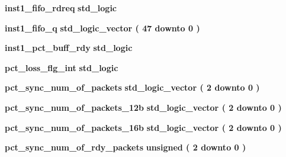 \begin{DoxyCompactItemize}
\item 
{\bf inst1\+\_\+fifo\+\_\+rdreq} {\bfseries \textcolor{comment}{std\+\_\+logic}\textcolor{vhdlchar}{ }} 
\item 
{\bf inst1\+\_\+fifo\+\_\+q} {\bfseries \textcolor{comment}{std\+\_\+logic\+\_\+vector}\textcolor{vhdlchar}{ }\textcolor{vhdlchar}{(}\textcolor{vhdlchar}{ }\textcolor{vhdlchar}{ } \textcolor{vhdldigit}{47} \textcolor{vhdlchar}{ }\textcolor{keywordflow}{downto}\textcolor{vhdlchar}{ }\textcolor{vhdlchar}{ } \textcolor{vhdldigit}{0} \textcolor{vhdlchar}{ }\textcolor{vhdlchar}{)}\textcolor{vhdlchar}{ }} 
\item 
{\bf inst1\+\_\+pct\+\_\+buff\+\_\+rdy} {\bfseries \textcolor{comment}{std\+\_\+logic}\textcolor{vhdlchar}{ }} 
\item 
{\bf pct\+\_\+loss\+\_\+flg\+\_\+int} {\bfseries \textcolor{comment}{std\+\_\+logic}\textcolor{vhdlchar}{ }} 
\item 
{\bf pct\+\_\+sync\+\_\+num\+\_\+of\+\_\+packets} {\bfseries \textcolor{comment}{std\+\_\+logic\+\_\+vector}\textcolor{vhdlchar}{ }\textcolor{vhdlchar}{(}\textcolor{vhdlchar}{ }\textcolor{vhdlchar}{ } \textcolor{vhdldigit}{2} \textcolor{vhdlchar}{ }\textcolor{keywordflow}{downto}\textcolor{vhdlchar}{ }\textcolor{vhdlchar}{ } \textcolor{vhdldigit}{0} \textcolor{vhdlchar}{ }\textcolor{vhdlchar}{)}\textcolor{vhdlchar}{ }} 
\item 
{\bf pct\+\_\+sync\+\_\+num\+\_\+of\+\_\+packets\+\_\+12b} {\bfseries \textcolor{comment}{std\+\_\+logic\+\_\+vector}\textcolor{vhdlchar}{ }\textcolor{vhdlchar}{(}\textcolor{vhdlchar}{ }\textcolor{vhdlchar}{ } \textcolor{vhdldigit}{2} \textcolor{vhdlchar}{ }\textcolor{keywordflow}{downto}\textcolor{vhdlchar}{ }\textcolor{vhdlchar}{ } \textcolor{vhdldigit}{0} \textcolor{vhdlchar}{ }\textcolor{vhdlchar}{)}\textcolor{vhdlchar}{ }} 
\item 
{\bf pct\+\_\+sync\+\_\+num\+\_\+of\+\_\+packets\+\_\+16b} {\bfseries \textcolor{comment}{std\+\_\+logic\+\_\+vector}\textcolor{vhdlchar}{ }\textcolor{vhdlchar}{(}\textcolor{vhdlchar}{ }\textcolor{vhdlchar}{ } \textcolor{vhdldigit}{2} \textcolor{vhdlchar}{ }\textcolor{keywordflow}{downto}\textcolor{vhdlchar}{ }\textcolor{vhdlchar}{ } \textcolor{vhdldigit}{0} \textcolor{vhdlchar}{ }\textcolor{vhdlchar}{)}\textcolor{vhdlchar}{ }} 
\item 
{\bf pct\+\_\+sync\+\_\+num\+\_\+of\+\_\+rdy\+\_\+packets} {\bfseries \textcolor{comment}{unsigned}\textcolor{vhdlchar}{ }\textcolor{vhdlchar}{(}\textcolor{vhdlchar}{ }\textcolor{vhdlchar}{ } \textcolor{vhdldigit}{2} \textcolor{vhdlchar}{ }\textcolor{keywordflow}{downto}\textcolor{vhdlchar}{ }\textcolor{vhdlchar}{ } \textcolor{vhdldigit}{0} \textcolor{vhdlchar}{ }\textcolor{vhdlchar}{)}\textcolor{vhdlchar}{ }} 

\end{DoxyCompactItemize}
